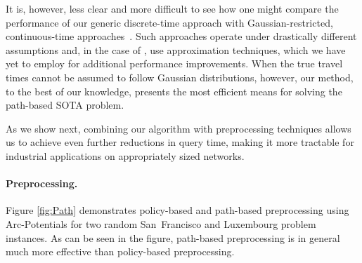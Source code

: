 \documentclass[oribibl]{llncs}
\begin{document}
			It is, however, less clear and more difficult to see how one might compare the
			performance of our generic discrete-time approach with Gaussian-restricted,
			continuous-time approaches~\cite{lim2013practical,lim2010stochastic}.
			Such approaches operate under drastically different assumptions and,
			in the case of \citep{lim2013practical}, use approximation techniques,
			which we have yet to employ for additional performance improvements.
			When the true travel times cannot be assumed to follow Gaussian distributions,
			however, our method, to the best of our knowledge, presents the most efficient means
			for solving the path-based SOTA problem.

			As we show next, combining our algorithm with preprocessing techniques allows us to achieve
			even further reductions in query time, making it more tractable for industrial applications on
			appropriately sized networks.

		\paragraph{Preprocessing.}
			Figure \ref{fig:Path} demonstrates policy-based and path-based preprocessing using Arc-Potentials
			for two random San~Francisco and Luxembourg problem instances.
			As can be seen in the figure, path-based preprocessing is in general much more effective
			than policy-based preprocessing.
\end{document}
